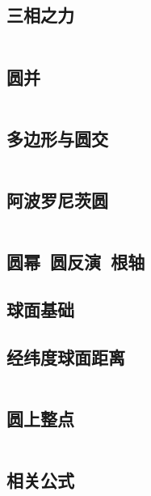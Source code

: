 \documentclass[titlepage, a4paper]{article}
\newcommand\nothing{}
\renewcommand{\checkmark}[0]{\nothing}
\begin{document}
\begin{multicols}{2}
\begin{spacing}{0.6}
				\subsection{三相之力\checkmark}
				\inputminted{cpp}{src/Geometry/三角形.cpp}
				\subsection{圆并}
				\inputminted{cpp}{src/Geometry/圆并.cpp}
				\subsection{多边形与圆交}
				\inputminted{cpp}{src/Geometry/多边形和圆的交.cpp}
				\subsection{阿波罗尼茨圆}
				\inputminted{cpp}{src/Geometry/阿波罗尼茨圆.tex}
				\subsection{圆幂~圆反演~根轴}
				
				\subsection{球面基础}
				
				\subsection{经纬度球面距离\checkmark}
				\inputminted{cpp}{src/Geometry/经纬度求球面最短距离.cpp}
				\subsection{圆上整点\checkmark}
				\inputminted{cpp}{src/Geometry/圆上整点.cpp}
				\subsection{相关公式}
				
				\newpage

\end{spacing}
\end{multicols}
\end{document}
